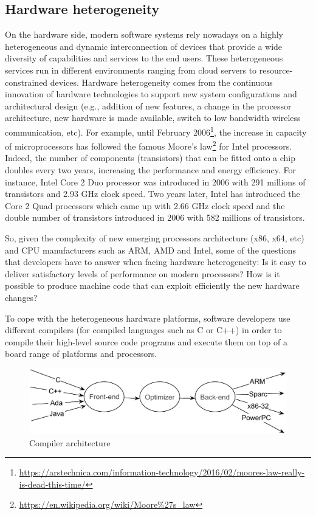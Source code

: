 \subsection{Hardware heterogeneity}
On the hardware side, modern software systems rely nowadays on a highly heterogeneous and dynamic interconnection of devices that provide a wide diversity of capabilities and services to the end users.
These heterogeneous services run in different environments ranging from cloud servers to resource-constrained devices.
Hardware heterogeneity comes from the continuous innovation of hardware technologies to support new system configurations and architectural design (e.g., addition of new features, a change in the processor architecture, new hardware is made available, switch to low bandwidth wireless communication, etc). 
For example, until February 2006\footnote{\url{https://arstechnica.com/information-technology/2016/02/moores-law-really-is-dead-this-time/}}, the increase in capacity of microprocessors has followed the famous Moore's law\footnote{\url{https://en.wikipedia.org/wiki/Moore\%27s_law}} for Intel processors. Indeed, the number of components (transistors) that can be fitted onto a chip doubles every two years, increasing the performance and energy efficiency.
For instance, Intel Core 2 Duo processor was introduced in 2006 with 291 millions of transistors and 2.93 GHz clock speed. Two years later, Intel has introduced the Core 2 Quad processors which came up with 2.66 GHz clock speed and the double number of transistors introduced in 2006 with 582 millions of transistors.

So, given the complexity of new emerging processors architecture (x86, x64, etc) and CPU manufacturers such as ARM, AMD and Intel, some of the questions that developers have to answer when facing hardware heterogeneity: 
Is it easy to deliver satisfactory levels of performance on modern processors? How is it possible to produce machine code that can exploit efficiently the new hardware changes? 

To cope with the heterogeneous hardware platforms, software developers use different compilers (for compiled languages such as C or C++) in order to compile their high-level source code programs and execute them on top of a board range of platforms and processors. 

\begin{figure}[h]
	\center
	\includegraphics[scale=0.65]{Background/fig/compilers}
	\caption{Compiler architecture}
	\label{fig:compilers}
\end{figure}

